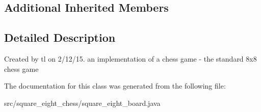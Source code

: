 \subsection*{Additional Inherited Members}


\subsection{Detailed Description}
Created by tl on 2/12/15. an implementation of a chess game -\/ the standard 8x8 chess game 

The documentation for this class was generated from the following file\+:\begin{DoxyCompactItemize}
\item 
src/square\+\_\+eight\+\_\+chess/square\+\_\+eight\+\_\+board.\+java\end{DoxyCompactItemize}
